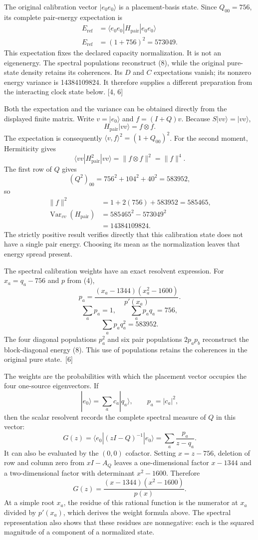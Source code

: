 \documentclass[10pt,twocolumn,letterpaper]{article}
\begin{document}
The original calibration vector $|e_0e_0\rangle$ is a placement-basis state. Since $Q_{00}=756$, its complete pair-energy expectation is
\begin{equation}
\begin{aligned}
E_{\mathrm{ref}}&=\langle e_0e_0|H_{\mathrm{pair}}|e_0e_0\rangle\\
E_{\mathrm{ref}}&=(1+756)^2=573049.
\end{aligned}
\tag{8}
\end{equation}
This expectation fixes the declared capacity normalization. It is not an eigenenergy. The spectral populations reconstruct (8), while the original pure-state density retains its coherences. Its $D$ and $C$ expectations vanish; its nonzero energy variance is 14384109824. It therefore supplies a different preparation from the interacting clock state below. [4, 6]

Both the expectation and the variance can be obtained directly from the displayed finite matrix. Write $v=|e_0\rangle$ and $f=(I+Q)v$. Because $S|vv\rangle=|vv\rangle$,
\[
H_{\mathrm{pair}}|vv\rangle=f\otimes f.
\]
The expectation is consequently $\langle v,f\rangle^2=(1+Q_{00})^2$. For the second moment, Hermiticity gives
\[
\langle vv|H_{\mathrm{pair}}^2|vv\rangle
=\|f\otimes f\|^2=\|f\|^4.
\]
The first row of $Q$ gives
\[
(Q^2)_{00}=756^2+104^2+40^2=583952,
\]
so
\[
\begin{aligned}
\|f\|^2&=1+2(756)+583952=585465,\\
\operatorname{Var}_{vv}(H_{\mathrm{pair}})
&=585465^2-573049^2\\
&=14384109824.
\end{aligned}
\]
The strictly positive result verifies directly that this calibration state does not have a single pair energy. Choosing its mean as the normalization leaves that energy spread present.



The spectral calibration weights have an exact resolvent expression. For $x_a=q_a-756$ and $p$ from (4),
\[
p_a=\frac{(x_a-1344)(x_a^2-1600)}{p'(x_a)}.
\]
\[
\sum_a p_a=1,\qquad \sum_a p_aq_a=756,
\]
\[
\sum_a p_aq_a^2=583952.
\]
The four diagonal populations $p_a^2$ and six pair populations $2p_ap_b$ reconstruct the block-diagonal energy (8). This use of populations retains the coherences in the original pure state.~[6]

The weights are the probabilities with which the placement vector occupies the four one-source eigenvectors. If
\[
|e_0\rangle=\sum_a c_a|q_a\rangle,
\qquad p_a=|c_a|^2,
\]
then the scalar resolvent records the complete spectral measure of $Q$ in this vector:
\[
G(z)=\langle e_0|(zI-Q)^{-1}|e_0\rangle
=\sum_a\frac{p_a}{z-q_a}.
\]
It can also be evaluated by the $(0,0)$ cofactor. Setting $x=z-756$, deletion of row and column zero from $xI-A_Q$ leaves a one-dimensional factor $x-1344$ and a two-dimensional factor with determinant $x^2-1600$. Therefore
\[
G(z)=\frac{(x-1344)(x^2-1600)}{p(x)}.
\]
At a simple root $x_a$, the residue of this rational function is the numerator at $x_a$ divided by $p'(x_a)$, which derives the weight formula above. The spectral representation also shows that these residues are nonnegative: each is the squared magnitude of a component of a normalized state.
\end{document}
